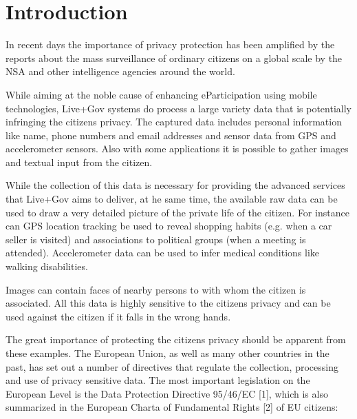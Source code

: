 \documentclass[external]{20120615_deliverable_template_ukob}
\theoremstyle{definition}
\begin{document}

\setcounter{tocdepth}{2}

\LGTOC

\newpage
\newcommand{\todo}[2]{\textcolor{magenta}{#1: #2}}

\chapter{Introduction}\label{chap:Introduction}
In recent days the importance of privacy protection has been amplified
by the reports about the mass surveillance of ordinary citizens on a
global scale by the NSA and other intelligence agencies around the
world.

While aiming at the noble cause of enhancing eParticipation using
mobile technologies, Live+Gov systems do process a large variety data
that is potentially infringing the citizens privacy. The captured data
includes personal information like name, phone numbers and email
addresses and sensor data from GPS and accelerometer sensors. Also
with some applications it is possible to gather images and textual
input from the citizen.

While the collection of this data is necessary for providing the
advanced services that Live+Gov aims to deliver, at he same time, the
available raw data can be used to draw a very detailed picture of the
private life of the citizen. For instance can GPS location tracking be
used to reveal shopping habits (e.g. when a car seller is visited) and
associations to political groups (when a meeting is
attended). Accelerometer data can be used to infer medical conditions
like walking disabilities.

Images can contain faces of nearby persons to with whom the citizen is
associated. All this data is highly sensitive to the citizens privacy
and can be used against the citizen if it falls in the wrong hands.

The great importance of protecting the citizens privacy should be
apparent from these examples. The European Union, as well as many
other countries in the past, has set out a number of directives that
regulate the collection, processing and use of privacy sensitive
data. The most important legislation on the European Level is the Data
Protection Directive 95/46/EC [1], which is also summarized in the
European Charta of Fundamental Rights [2] of EU citizens:
\end{document}
